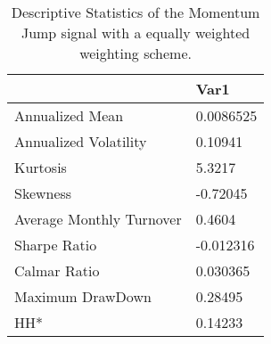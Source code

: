\begin{table}[H]
\centering
\begin{tabular}{ll}
\hline& Var1 \\ 
\hline 
Annualized Mean & 0.0086525 \\ 
Annualized Volatility & 0.10941 \\ 
Kurtosis & 5.3217 \\ 
Skewness & -0.72045 \\ 
Average Monthly Turnover & 0.4604 \\ 
Sharpe Ratio & -0.012316 \\ 
Calmar Ratio & 0.030365 \\ 
Maximum DrawDown & 0.28495 \\ 
HH* & 0.14233 \\ 
\hline
\end{tabular}
\caption{Descriptive Statistics of the Momentum Jump signal with a equally weighted weighting scheme.}
\label{MOMJUMPEW}
\end{table}